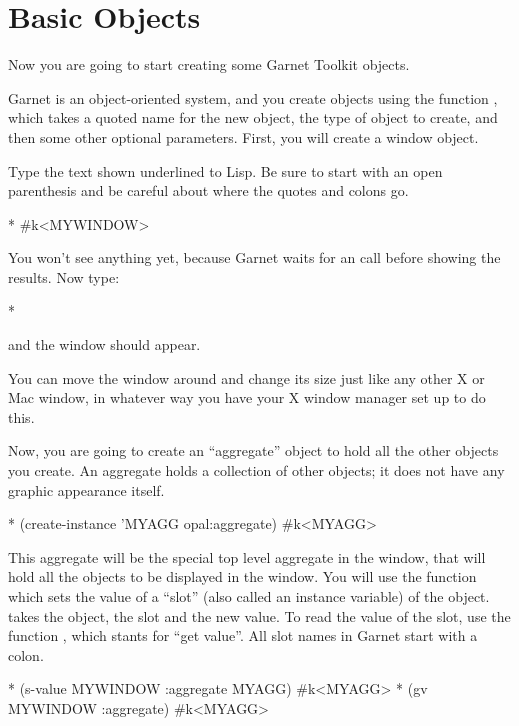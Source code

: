 \section{Basic Objects}
Now you are going to start creating some Garnet Toolkit objects.

Garnet is an object-oriented system, and you create objects using the
function , which takes a quoted name for the new
object, the type of object to create, and then some other optional
parameters.  First, you will create a window object.

Type the text shown underlined to Lisp.  Be sure to start with an open
parenthesis and be careful about where the quotes and colons go.
\begin{programexample}
* 
\#k<MYWINDOW>
\end{programexample}

You won't see anything yet, because Garnet waits for an  call
before showing the results.  Now type:
\begin{programexample}
* 
\end{programexample}
and the window should appear.

You can move the window around and change its size just like any other
X or Mac window, in whatever way you have your X window manager set up
to do this.

Now, you are going to create an ``aggregate'' object to hold all the other
objects you create.  An aggregate holds a collection of other objects; it
does not have any graphic appearance itself.
\begin{programexample}
* (create-instance 'MYAGG opal:aggregate)
\#k<MYAGG>
\end{programexample}
This aggregate will be the special top level aggregate in the window, that
will hold all the objects to be displayed in the window.  You will use the
function  which sets the value of a ``slot'' (also called an
instance variable) of the object.   takes the object, the slot
and the new value.  To read the value of the slot, use the function ,
which stants for ``get value''.  All slot names in Garnet start
with a colon.
\begin{programexample}
* (s-value MYWINDOW :aggregate MYAGG)
\#k<MYAGG>
* (gv MYWINDOW :aggregate)
\#k<MYAGG>
\end{programexample}

